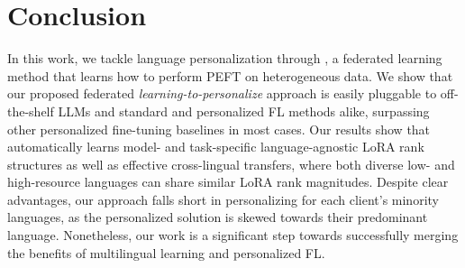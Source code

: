 \vspace{-0.5em}
\section{Conclusion}\label{sec:conclusion}

In this work, we tackle language personalization through \method{}, a federated learning method that learns how to perform PEFT on heterogeneous data. We show that our proposed federated {\em learning-to-personalize} approach is easily pluggable to off-the-shelf LLMs and standard and personalized FL methods alike, surpassing other personalized fine-tuning baselines in most cases. Our results show that \method{} automatically learns model- and task-specific language-agnostic LoRA rank structures as well as effective cross-lingual transfers, where both diverse low- and high-resource languages can share similar LoRA rank magnitudes. Despite clear advantages, our approach falls short in personalizing for each client's minority languages, as the personalized solution is skewed towards their predominant language. Nonetheless, our work is a significant step towards successfully merging the benefits of multilingual learning and personalized FL.
